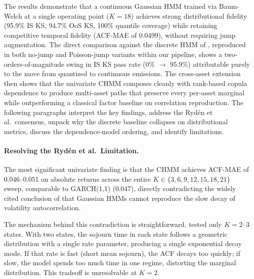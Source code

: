 The results demonstrate that a continuous Gaussian HMM trained via Baum-Welch at a single operating point ($K = 18$) achieves strong distributional fidelity (95.9\% IS KS, 94.7\% OoS KS, 100\% quantile coverage) while retaining competitive temporal fidelity (ACF-MAE of 0.0499), without requiring jump augmentation.
The direct comparison against the discrete HMM of \citet{alswaidan2026hybrid}, reproduced in both no-jump and Poisson-jump variants within our pipeline, shows a two-orders-of-magnitude swing in IS KS pass rate (0\% $\to$ 95.9\%) attributable purely to the move from quantized to continuous emissions.
The cross-asset extension then shows that the univariate CHMM composes cleanly with rank-based copula dependence to produce multi-asset paths that preserve every per-asset marginal while outperforming a classical factor baseline on correlation reproduction.
The following paragraphs interpret the key findings, address the Ryd\'{e}n et al.\ consensus, unpack why the discrete baseline collapses on distributional metrics, discuss the dependence-model ordering, and identify limitations.

\paragraph{Resolving the Ryd\'{e}n et al.\ Limitation.}
The most significant univariate finding is that the CHMM achieves ACF-MAE of 0.046--0.051 on absolute returns across the entire $K \in \{3, 6, 9, 12, 15, 18, 21\}$ sweep, comparable to GARCH(1,1) (0.047), directly contradicting the widely cited conclusion of \citet{ryden1998stylized} that Gaussian HMMs cannot reproduce the slow decay of volatility autocorrelation.

The mechanism behind this contradiction is straightforward.
\citet{ryden1998stylized} tested only $K = 2$--$3$ states.
With two states, the sojourn time in each state follows a geometric distribution with a single rate parameter, producing a single exponential decay mode.
If that rate is fast (short mean sojourn), the ACF decays too quickly; if slow, the model spends too much time in one regime, distorting the marginal distribution.
This tradeoff is unresolvable at $K = 2$.

